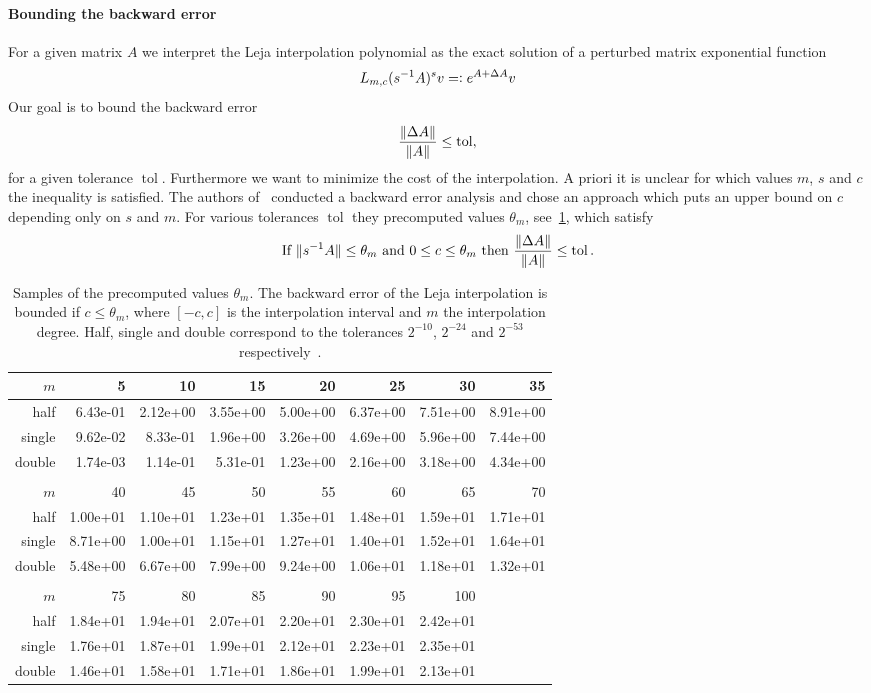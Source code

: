 \documentclass{scrartcl}
\newcommand{\eqdefn}{=\mathrel{\mathop:}}
\begin{document}
	\paragraph{Bounding the backward error} For a given matrix $A$ we interpret the Leja interpolation polynomial as the exact solution of a perturbed matrix exponential function
	\[
	L_{m,c}(s^{-1}A)^sv \eqdefn e^{A + \Delta A}v\\
	\]
	Our goal is to bound the backward error 
	\[
	\frac{\lVert\Delta A\rVert}{\lVert A\rVert} \le \operatorname{tol}, 
	\]
	for a given tolerance $\operatorname{tol}$. Furthermore we want to minimize the cost of the interpolation. A priori it is unclear for which values $m$, $s$ and $c$ the inequality is satisfied. The authors of~\cite{lejarev} conducted a backward error analysis and chose an approach which puts an upper bound on $c$ depending only on $s$ and $m$. For various tolerances $\operatorname{tol}$ they precomputed values $\theta_m$, see~\ref{table:thetam}, which satisfy
	\[
	\text{If}\ \norm{s^{-1}A}\le \theta_m\ \text{and}\ 0 \le c \le \theta_m\ \text{then}\ \frac{\norm{\Delta A}}{\norm{A}} \le \operatorname{tol}.
	\]
	\begin{table}[tbp]
		\begin{tabular}{r|rrrrrrr}
			$m$ &        5 &       10 &       15 &       20 &       25 &       30 &       35 \\\hline
			half & 6.43e-01 & 2.12e+00 & 3.55e+00 & 5.00e+00 & 6.37e+00 & 7.51e+00 & 8.91e+00 \\
			single & 9.62e-02 & 8.33e-01 & 1.96e+00 & 3.26e+00 & 4.69e+00 & 5.96e+00 & 7.44e+00 \\
			double & 1.74e-03 & 1.14e-01 & 5.31e-01 & 1.23e+00 & 2.16e+00 & 3.18e+00 & 4.34e+00 \\
			\\
			$m$ &       40 &       45 &       50 &       55 &       60 &       65 &       70 \\\hline
			half & 1.00e+01 & 1.10e+01 & 1.23e+01 & 1.35e+01 & 1.48e+01 & 1.59e+01 & 1.71e+01 \\
			single & 8.71e+00 & 1.00e+01 & 1.15e+01 & 1.27e+01 & 1.40e+01 & 1.52e+01 & 1.64e+01 \\
			double & 5.48e+00 & 6.67e+00 & 7.99e+00 & 9.24e+00 & 1.06e+01 & 1.18e+01 & 1.32e+01 \\
			\\
			$m$ &       75 &       80 &       85 &       90 &       95 &      100 \\ \hline
			half & 1.84e+01 & 1.94e+01 & 2.07e+01 & 2.20e+01 & 2.30e+01 & 2.42e+01 \\
			single & 1.76e+01 & 1.87e+01 & 1.99e+01 & 2.12e+01 & 2.23e+01 & 2.35e+01 \\
			double & 1.46e+01 & 1.58e+01 & 1.71e+01 & 1.86e+01 & 1.99e+01 & 2.13e+01
		\end{tabular}
		\caption{Samples of the precomputed values $\theta_m$. The backward error of the Leja interpolation is bounded if $c\le\theta_m$, where $[-c,c]$ is the interpolation interval and $m$ the interpolation degree. Half, single and double correspond to the tolerances $2^{-10}$, $2^{-24}$ and $2^{-53}$ respectively~\cite[Table 1]{lejarev}.}
		\label{table:thetam}
	\end{table}	
\end{document}
